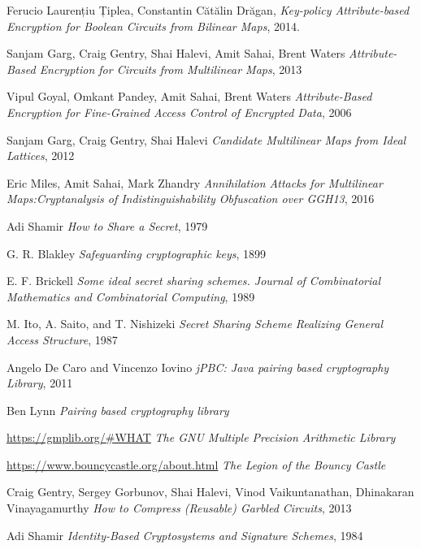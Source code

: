 \documentclass[12pt]{article}
\begin{document}
\begin{thebibliography}{9}

Ferucio Laurențiu Țiplea, Constantin Cătălin Drăgan, 
\textit{Key-policy Attribute-based Encryption for Boolean Circuits from Bilinear Maps}, 2014.

Sanjam Garg, Craig Gentry, Shai Halevi, Amit Sahai, Brent Waters 
\textit{Attribute-Based Encryption for Circuits from Multilinear Maps}, 2013
 
Vipul Goyal, Omkant Pandey, Amit Sahai, Brent Waters 
\textit{Attribute-Based Encryption for Fine-Grained Access Control of Encrypted Data}, 2006

Sanjam Garg, Craig Gentry, Shai Halevi
\textit{Candidate Multilinear Maps from Ideal Lattices}, 2012

Eric Miles, Amit Sahai, Mark Zhandry
\textit{Annihilation Attacks for Multilinear Maps:Cryptanalysis of Indistinguishability Obfuscation over GGH13}, 2016

Adi Shamir
\textit{How to Share a Secret}, 1979

G. R. Blakley
\textit{Safeguarding cryptographic keys}, 1899

E. F. Brickell
\textit{Some ideal secret sharing schemes. Journal of Combinatorial Mathematics and Combinatorial Computing}, 1989

M. Ito, A. Saito, and T. Nishizeki
\textit{Secret Sharing Scheme Realizing General Access Structure}, 1987

Angelo {De Caro} and Vincenzo Iovino
\textit{jPBC: Java pairing based cryptography Library}, 2011

Ben Lynn
\textit{Pairing based cryptography library}

\href{https://gmplib.org/\#WHAT}{https://gmplib.org/\#WHAT}
\textit{The GNU Multiple Precision Arithmetic Library}

\href{https://www.bouncycastle.org/about.html}{https://www.bouncycastle.org/about.html}
\textit{The Legion of the Bouncy Castle}

Craig Gentry, Sergey Gorbunov, Shai Halevi, Vinod Vaikuntanathan, Dhinakaran Vinayagamurthy
\textit{How to Compress (Reusable) Garbled Circuits}, 2013

Adi Shamir
\textit{Identity-Based Cryptosystems and Signature Schemes}, 1984 


\end{thebibliography}
\end{document}
